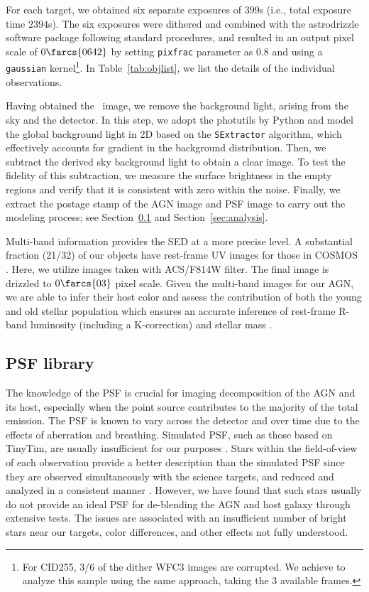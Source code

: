 \documentclass[apj]{emulateapj}
\begin{document}
For each target, we obtained six separate exposures of $399$s (i.e., total exposure time $2394$s). The six exposures were dithered and combined with the {\sc astrodrizzle} software package following standard procedures, and resulted in an output pixel scale of $0\farcs{0642}$ by setting \texttt{pixfrac} parameter as $0.8$ and using a \texttt{gaussian} kernel\footnote{\label{note1}For CID255, 3/6 of the dither WFC3 images are corrupted. We achieve to analyze this sample using the same approach, taking the 3 available frames.}. In Table~\ref{tab:objlist}, we list the details of the individual observations.

Having obtained the \hst\ image, we remove the background light, arising from the sky and the detector. In this step, we adopt the {\sc photutils} by Python and model the global background light in 2D based on the \texttt{SExtractor} algorithm, which effectively accounts for gradient in the background distribution. Then, we subtract the derived  sky background light to obtain a clear image. To test the fidelity of this subtraction, we measure the surface brightness in the empty regions and verify that it is consistent with zero within the noise. Finally, we extract the postage stamp of the AGN image and PSF image to carry out the modeling process; see Section~\ref{sec:psf_library} and Section~\ref{sec:analysis}.

Multi-band information provides the SED at a more precise level. A substantial fraction (21/32) of our objects have rest-frame UV images for those in COSMOS \citep{Koekemoer2007}. Here, we utilize images taken with ACS/F814W filter. The final image is drizzled to $0\farcs{03}$ pixel scale. Given the multi-band images for our AGN, we are able to infer their host color and assess the contribution of both the young and old stellar population which ensures an accurate inference of rest-frame R-band luminosity (including a K-correction) and stellar mass \citep{Gallazzi2009}. 

\subsection{PSF library}
\label{sec:psf_library}

The knowledge of the PSF is crucial for imaging decomposition of the AGN and its host, especially when the point source contributes to the majority of the total emission. The PSF is known to vary across the detector and over time due to the effects of aberration and breathing. Simulated PSF, such as those based on {\sc TinyTim}, are usually insufficient for our purposes \citep{Mechtley2012}. Stars within the field-of-view of each observation provide a better description than the simulated PSF since they are observed simultaneously with the science targets, and reduced and analyzed in a consistent manner \citet{Kim2008, Park15}. However, we have found that such stars usually do not provide an ideal PSF for de-blending the AGN and host galaxy through extensive tests. The issues are associated with an insufficient number of bright stars near our targets, color differences, and other effects not fully understood.
\end{document}
